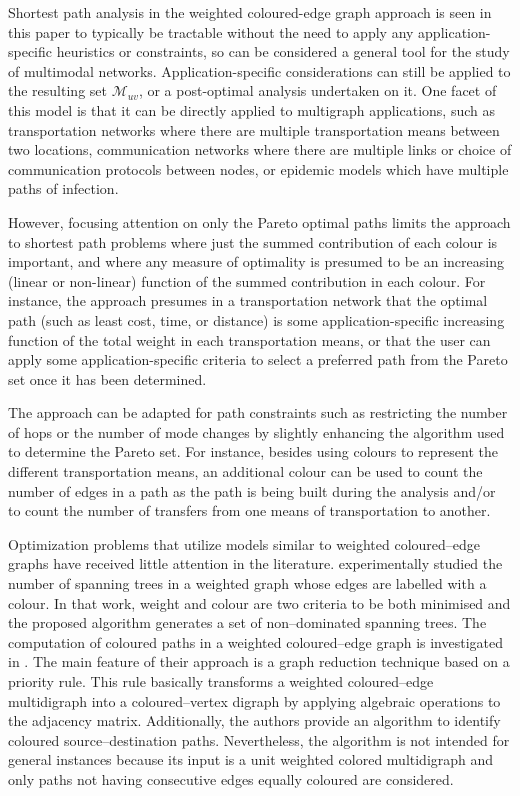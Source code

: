 \documentclass[preprint,authoryear,12pt]{elsarticle}
\begin{document}
Shortest path analysis in the weighted coloured-edge graph approach
is seen in this paper to typically be tractable without the need
to apply any application-specific heuristics or constraints,
so can be considered a general tool for the study of multimodal networks.
Application-specific considerations can still be applied to the
resulting set $\mathcal{M}_{uv}$, or a post-optimal analysis undertaken on it.
One facet of this model is that it can be directly applied to
multigraph applications, such as transportation networks where there are multiple
transportation means between two locations, communication networks where there
are multiple links or choice of communication protocols between nodes,
or epidemic models which have multiple paths of infection.

However, focusing attention on only the Pareto optimal paths limits the approach to
shortest path problems where just the summed contribution of each colour
is important, and where any measure of optimality is presumed to be
an increasing (linear or non-linear) function of the summed contribution
in each colour.
For instance, the approach presumes in a transportation network that
the optimal path (such as least cost, time, or distance)
is some application-specific increasing function of the total weight
in each transportation means, or that the user can apply some application-specific
criteria to select a preferred path from the Pareto set once it has been determined.

The approach can be adapted for path constraints
such as restricting the number of hops or the number of mode changes by
slightly enhancing the algorithm used to determine the Pareto set.
For instance, besides using colours to represent the different transportation means,
an additional colour can be used to count the number of edges in a path
as the path is being built during the analysis
and/or to count the number of transfers from one means of transportation to another.

Optimization problems that utilize models similar to weighted coloured--edge graphs
have received little attention in the literature. \cite{Climaco2010} experimentally
studied the number of spanning trees in a weighted graph whose edges are labelled
with a colour. In that work, weight and colour are two criteria to be both minimised
and the proposed algorithm generates a set of non--dominated spanning trees.
The computation of coloured paths in a weighted coloured--edge graph is investigated
in \cite{Xu2009}. The main feature of their approach is a graph reduction technique
based on a priority rule. This rule basically transforms a weighted coloured--edge
multidigraph into a coloured--vertex digraph by applying algebraic operations to the
adjacency matrix. Additionally, the authors provide an algorithm to identify coloured
source--destination paths. Nevertheless, the algorithm is not intended
for general instances because its input is a unit weighted colored multidigraph and only
paths not having consecutive edges equally coloured are considered.
\end{document}
